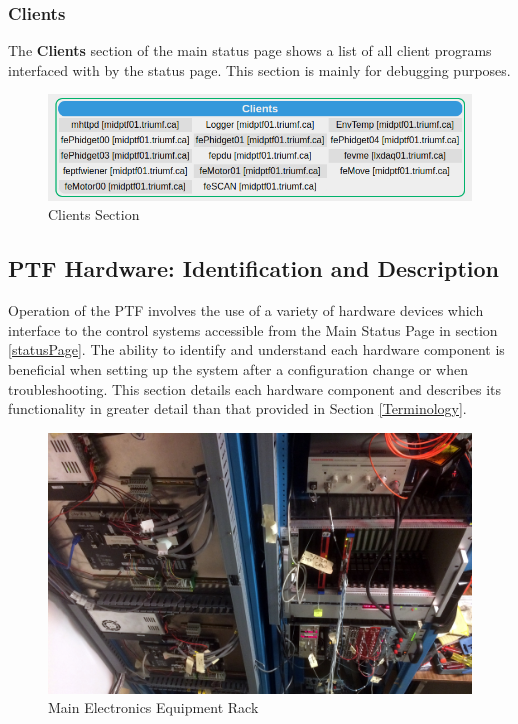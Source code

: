 \documentclass[twoside,letterpaper]{refart}
\begin{document}
\FloatBarrier

\subsubsection{Clients}

The \textbf{Clients} section of the main status page shows a list of all client programs interfaced with by the status page.  This section is mainly for debugging purposes. 

\FloatBarrier

\begin{figure}[!htpb] 
	\centering	
	\includegraphics[scale=0.3]{images/clients.png}
	\caption{Clients Section}
	\label{clients}
\end{figure}

\FloatBarrier

\clearpage

\subsection{PTF Hardware:  Identification and Description}

Operation of the PTF involves the use of a variety of hardware devices which interface to the control systems accessible from the Main Status Page in section \ref{statusPage}. The ability to identify and understand each hardware component is beneficial when setting up the system after a configuration change or when troubleshooting.  This section details each hardware component and describes its functionality in greater detail than that provided in Section \ref{Terminology}.

\FloatBarrier

\begin{figure}[!htpb] 
	\centering	
	\includegraphics[scale=0.07]{images/rack}
	\caption{Main Electronics Equipment Rack}
	\label{mainEquipmentRack}
\end{figure}
\end{document}
